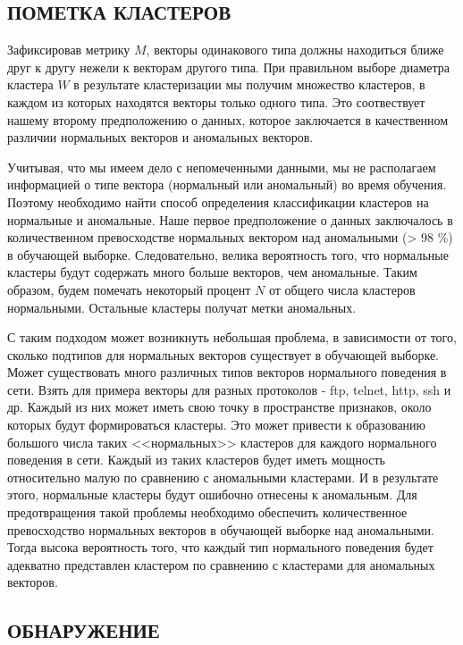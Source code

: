 \documentclass[12pt,a4paper]{article}
\begin{document}
\subsection{ПОМЕТКА КЛАСТЕРОВ}

Зафиксировав метрику $M$, векторы одинакового типа должны находиться 
ближе друг к другу нежели к векторам другого типа. При правильном выборе
диаметра кластера $W$ в результате кластеризации мы получим множество кластеров, 
в каждом из которых находятся векторы только одного типа. Это соотвествует нашему
второму предположению о данных, которое заключается в качественном различии
нормальных векторов и аномальных векторов.

Учитывая, что мы имеем дело с непомеченными данными, мы не располагаем информацией
о типе вектора (нормальный или аномальный) во время обучения. Поэтому необходимо
найти способ определения классификации кластеров на нормальные и аномальные.
Наше первое предположение о данных заключалось в количественном превосходстве
нормальных вектором над аномальными (> 98 \%) в обучающей выборке. Следовательно, 
велика вероятность того, что нормальные кластеры будут содержать много больше векторов, 
чем аномальные. Таким образом, будем помечать некоторый процент $N$ от общего 
числа кластеров нормальными. Остальные кластеры получат метки аномальных.

С таким подходом может возникнуть небольшая проблема, в зависимости от того,
сколько подтипов для нормальных векторов существует в обучающей выборке.
Может существовать много различных типов векторов нормального поведения
в сети. Взять для примера векторы для разных протоколов - ftp, telnet, http, ssh и др.
Каждый из них может иметь свою точку в пространстве признаков, около которых
будут формироваться кластеры. Это может привести к образованию большого
числа таких <<нормальных>> кластеров для каждого нормального поведения в сети.
Каждый из таких кластеров будет иметь мощность относительно малую по сравнению с 
аномальными кластерами. И в результате этого, нормальные кластеры будут ошибочно
отнесены к аномальным. Для предотвращения такой проблемы необходимо обеспечить
количественное превосходство нормальных векторов в обучающей выборке над
аномальными. Тогда высока вероятность того, что каждый тип нормального поведения
будет адекватно представлен кластером по сравнению с кластерами для аномальных
векторов.

\subsection{ОБНАРУЖЕНИЕ}
\end{document}
